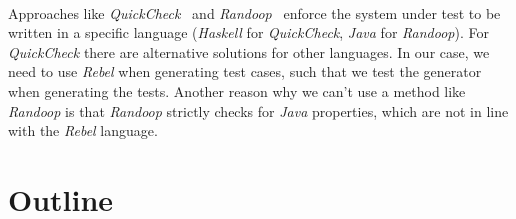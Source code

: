 \\
Approaches like \textit{QuickCheck}~\cite{claessen2011quickcheck} and
\textit{Randoop}~\cite{pacheco2007randoop} enforce the system under test to be
written in a specific language (\textit{Haskell} for \textit{QuickCheck},
\textit{Java} for \textit{Randoop}). For \textit{QuickCheck} there are
alternative solutions for other languages. In our case, we need to use
\textit{Rebel} when generating test cases, such that we test the generator when
generating the tests. Another reason why we can't use a method like
\textit{Randoop} is that \textit{Randoop} strictly checks for \textit{Java}
properties, which are not in line with the \textit{Rebel} language.

\section{Outline}

